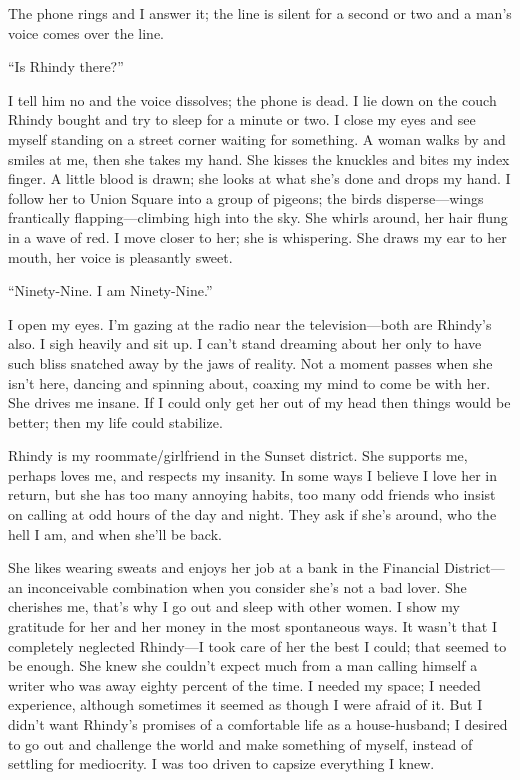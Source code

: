 The phone rings and I answer it; the line is silent for a second or two
and a man's voice comes over the line.

``Is Rhindy there?''

I tell him no and the voice dissolves; the phone is dead. I lie down on
the couch Rhindy bought and try to sleep for a minute or two. I close my
eyes and see myself standing on a street corner waiting for something. A
woman walks by and smiles at me, then she takes my hand. She kisses the
knuckles and bites my index finger. A little blood is drawn; she looks
at what she's done and drops my hand. I follow her to Union Square into
a group of pigeons; the birds disperse---wings frantically
flapping---climbing high into the sky. She whirls around, her hair flung
in a wave of red. I move closer to her; she is whispering. She draws my
ear to her mouth, her voice is pleasantly sweet.

``Ninety-Nine. I am Ninety-Nine.''

I open my eyes. I'm gazing at the radio near the television---both are
Rhindy's also. I sigh heavily and sit up. I can't stand dreaming about
her only to have such bliss snatched away by the jaws of reality. Not a
moment passes when she isn't here, dancing and spinning about, coaxing
my mind to come be with her. She drives me insane. If I could only get
her out of my head then things would be better; then my life could
stabilize.

Rhindy is my roommate/girlfriend in the Sunset district. She supports
me, perhaps loves me, and respects my insanity. In some ways I believe I
love her in return, but she has too many annoying habits, too many odd
friends who insist on calling at odd hours of the day and night. They
ask if she's around, who the hell I am, and when she'll be back.

She likes wearing sweats and enjoys her job at a bank in the Financial
District---an inconceivable combination when you consider she's not a
bad lover. She cherishes me, that's why I go out and sleep with other
women. I show my gratitude for her and her money in the most spontaneous
ways. It wasn't that I completely neglected Rhindy---I took care of her
the best I could; that seemed to be enough. She knew she couldn't expect
much from a man calling himself a writer who was away eighty percent of
the time. I needed my space; I needed experience, although sometimes it
seemed as though I were afraid of it. But I didn't want Rhindy's
promises of a comfortable life as a house-husband; I desired to go out
and challenge the world and make something of myself, instead of
settling for mediocrity. I was too driven to capsize everything I knew.

